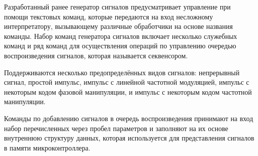 \documentclass{report}
\begin{document}

Разработанный ранее генератор сигналов предусматривает управление при помощи текстовых команд, которые передаются на вход несложному интерпретатору, вызывающему различные обработчики на основе названия команды. Набор команд генератора сигналов включает несколько служебных команд и ряд команд для осуществления операций по управлению очередью воспроизведения сигналов, которая называется секвенсором.

Поддерживаются несколько предопределённых видов сигналов: непрерывный сигнал, простой импульс, импульс с линейной частотной модуляцией, импульс с некоторым кодом фазовой манипуляции, и импульс с некоторым кодом частотной манипуляции.

Команды по добавлению сигналов в очередь воспроизведения принимают на вход набор перечисленных через пробел параметров и заполняют на их основе внутреннюю структуру данных, которая используется для представления сигналов в памяти микроконтроллера.
\end{document}
